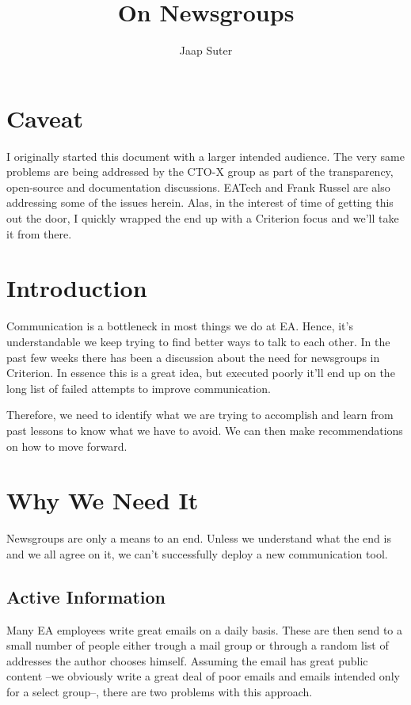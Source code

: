 \documentclass[twocolumn]{paper}
\begin{document}
\title{On Newsgroups}
\author{Jaap Suter}
\maketitle

\section{Caveat}

I originally started this document with a larger intended audience.
The very same problems are being addressed by the CTO-X group as
part of the transparency, open-source and documentation discussions.
EATech and Frank Russel are also addressing some of the issues
herein. Alas, in the interest of time of getting this out the door,
I quickly wrapped the end up with a Criterion focus and we'll take
it from there.

\section{Introduction}

Communication is a bottleneck in most things we do at EA. Hence,
it's understandable we keep trying to find better ways to talk to
each other. In the past few weeks there has been a discussion about
the need for newsgroups in Criterion. In essence this is a great
idea, but executed poorly it'll end up on the long list of failed
attempts to improve communication.

Therefore, we need to identify what we are trying to accomplish and
learn from past lessons to know what we have to avoid. We can then
make recommendations on how to move forward.

\section{Why We Need It}

Newsgroups are only a means to an end. Unless we understand what the
end is and we all agree on it, we can't successfully deploy a new
communication tool.

\subsection{Active Information}

Many EA employees write great emails on a daily basis. These are
then send to a small number of people either trough a mail group or
through a random list of addresses the author chooses himself.
Assuming the email has great public content --we obviously write a
great deal of poor emails and emails intended only for a select
group--, there are two problems with this approach.
\end{document}
